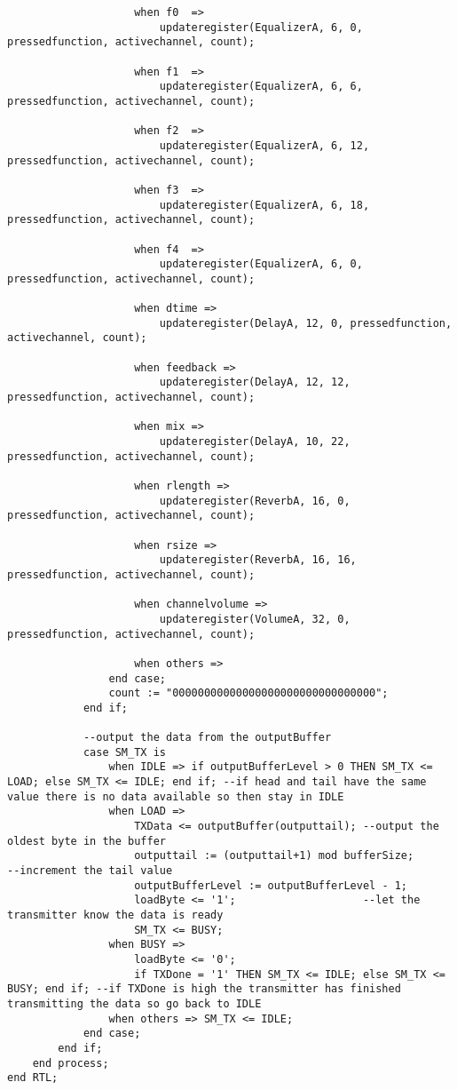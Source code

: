 \begin{lstlisting}
					when f0	 =>
						updateregister(EqualizerA, 6, 0, pressedfunction, activechannel, count);

					when f1	 => 
						updateregister(EqualizerA, 6, 6, pressedfunction, activechannel, count);

					when f2	 => 
						updateregister(EqualizerA, 6, 12, pressedfunction, activechannel, count);

					when f3	 =>  
						updateregister(EqualizerA, 6, 18, pressedfunction, activechannel, count);

					when f4	 =>  
						updateregister(EqualizerA, 6, 0, pressedfunction, activechannel, count);

					when dtime =>   
						updateregister(DelayA, 12, 0, pressedfunction, activechannel, count);

					when feedback =>   
						updateregister(DelayA, 12, 12, pressedfunction, activechannel, count);

					when mix =>   
						updateregister(DelayA, 10, 22, pressedfunction, activechannel, count);

					when rlength =>   
						updateregister(ReverbA, 16, 0, pressedfunction, activechannel, count);

					when rsize =>   
						updateregister(ReverbA, 16, 16, pressedfunction, activechannel, count);

					when channelvolume =>  
						updateregister(VolumeA, 32, 0, pressedfunction, activechannel, count);

					when others =>
				end case;
				count := "00000000000000000000000000000000";
			end if;

			--output the data from the outputBuffer
			case SM_TX is
				when IDLE => if outputBufferLevel > 0 THEN SM_TX <= LOAD; else SM_TX <= IDLE; end if; --if head and tail have the same value there is no data available so then stay in IDLE
				when LOAD => 
					TXData <= outputBuffer(outputtail);	--output the oldest byte in the buffer
					outputtail := (outputtail+1) mod bufferSize;		--increment the tail value
					outputBufferLevel := outputBufferLevel - 1;
					loadByte <= '1';					--let the transmitter know the data is ready					
					SM_TX <= BUSY;
				when BUSY =>
					loadByte <= '0';
					if TXDone = '1' THEN SM_TX <= IDLE; else SM_TX <= BUSY; end if; --if TXDone is high the transmitter has finished transmitting the data so go back to IDLE
				when others => SM_TX <= IDLE;
			end case;
		end if;
	end process;
end RTL;
\end{lstlisting}